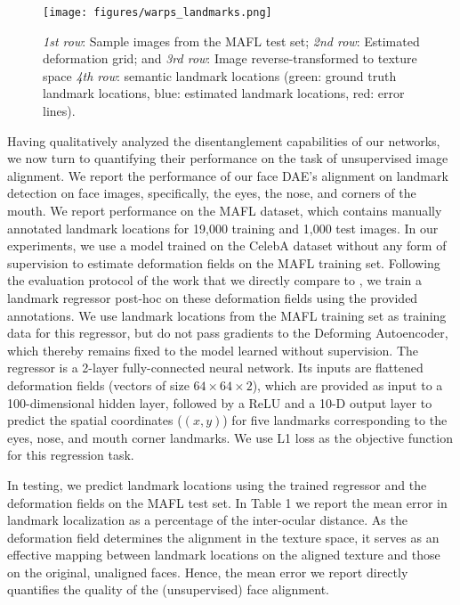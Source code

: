 \documentclass[runningheads]{llncs}
\begin{document}
\begin{figure}[!h]
    \centering
    \texttt{[image: figures/warps\_landmarks.png]}
    \caption{\emph{1st row}: Sample images from the MAFL test set; \emph{2nd row}:
    Estimated deformation grid; and \emph{3rd row}: Image reverse-transformed to texture space \emph{4th row}: semantic landmark locations (green: ground truth landmark locations, 
    blue: estimated landmark locations,
    red: error lines).}
    \label{fig:landmarksAndKeypoints}
\end{figure}
Having qualitatively analyzed the disentanglement capabilities of our networks, we now turn to quantifying their performance on the task of unsupervised image alignment. 
We report the performance of our face DAE's alignment on landmark detection on face images, specifically, the eyes, the nose, and corners of the mouth. 
We report performance on the MAFL dataset, which contains manually annotated landmark locations for 19,000 training and 1,000 test images.
In our experiments, we use a model trained on the CelebA dataset without any form of supervision to estimate deformation fields on the MAFL training set. Following the evaluation protocol of the work that we directly compare to \cite{ThewlisBV17a}, we train a landmark regressor post-hoc on these deformation fields using the provided annotations. We use landmark locations from the MAFL training set  as training data for this regressor, but do not pass gradients to the Deforming Autoencoder, which thereby remains fixed to the model learned without supervision. The regressor is a  2-layer fully-connected neural network. Its inputs are flattened deformation
  fields (vectors of size $64 \times 64 \times 2$), which are provided as input to a 100-dimensional hidden layer, followed by a ReLU and a 10-D output layer to predict the spatial coordinates ($(x, y)$) for five landmarks corresponding to the eyes, nose, and mouth corner landmarks. We use L1 loss as the objective function for this regression task.
  
In testing, we predict landmark locations using the trained regressor and the deformation fields on the MAFL test set. In Table 1 we report the mean error in landmark localization as a percentage of the inter-ocular distance. 
As the deformation field determines the alignment in the texture space, it serves as an effective mapping between landmark locations
on the aligned texture and those on the original, unaligned faces. Hence, the mean error we report directly quantifies the quality of
the (unsupervised) face alignment.  
  
\end{document}
